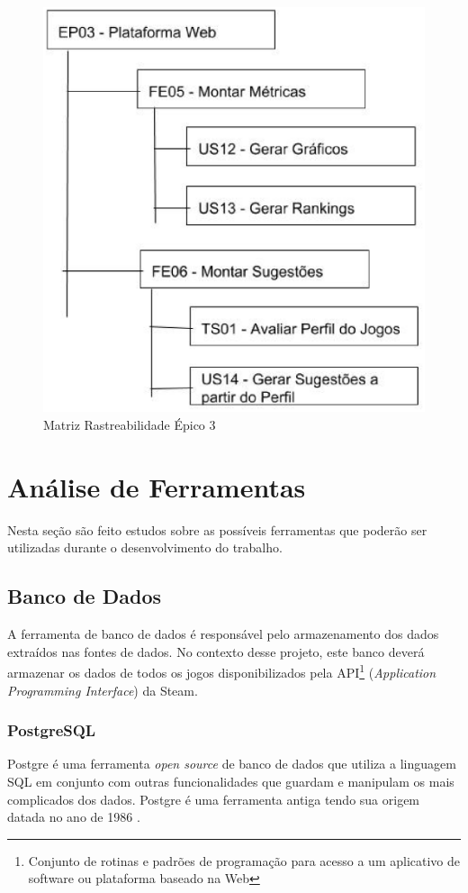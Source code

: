 \begin{figure}
\centering
\includegraphics[scale=0.35]{figuras/EP03.eps}
\caption{Matriz Rastreabilidade Épico 3}
\label{image:ep03}
\end{figure}
\section{Análise de Ferramentas}
Nesta seção são feito estudos sobre as possíveis ferramentas que poderão ser utilizadas durante o desenvolvimento do trabalho.
\subsection{Banco de Dados}
A ferramenta de banco de dados é responsável pelo armazenamento dos dados extraídos nas fontes de dados. No contexto desse projeto, este banco deverá armazenar os dados de todos os jogos disponibilizados pela API\footnote[1]{Conjunto de rotinas e padrões de programação para acesso a um aplicativo de software ou plataforma baseado na Web} (\textit{Application Programming Interface}) da Steam.
\subsubsection*{PostgreSQL}
Postgre é uma ferramenta \textit{open source} de banco de dados que utiliza a linguagem SQL em conjunto com outras funcionalidades que guardam e manipulam os mais complicados dos dados. Postgre é uma ferramenta antiga tendo sua origem datada no ano de 1986 \cite{postgresql}.

